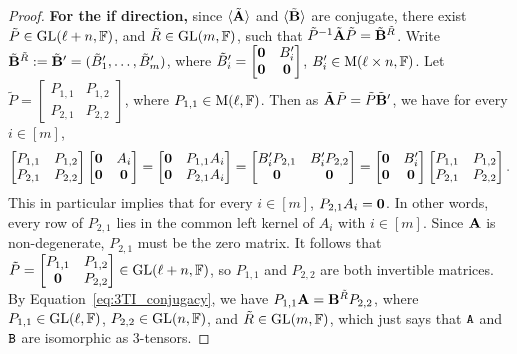 \documentclass[11pt]{article}
\begin{document}
\begin{proof}
\textbf{For the if direction,} since $\langle\tilde{\mathbf{A}}\rangle$ and $\langle\tilde{\mathbf{B}}\rangle$ are conjugate, 
there exist $\tilde P\in\mathrm{GL}(\ell+n, \mathbb{F})$, and $\tilde R\in\mathrm{GL}(m, \mathbb{F})$, such that 
$\tilde P^{-1}\tilde{\mathbf{A}} \tilde P=\tilde{\mathbf{B}}^{\tilde R}$. Write $\tilde{\mathbf{B}}^{\tilde R}:=\tilde{\mathbf{B}}'=(\tilde B_1', 
\dots, \tilde 
B_m')$, where $\tilde B_i'=\begin{bmatrix}
\mathbf{0} & B_i'\\
\mathbf{0} & \mathbf{0} 
\end{bmatrix}$, $B_i'\in\mathrm{M}(\ell\times n, \mathbb{F})$. Let $\tilde P=\begin{bmatrix}
P_{1,1} & P_{1,2}\\
P_{2,1} & P_{2,2}
\end{bmatrix}$, where $P_{1,1}\in \mathrm{M}(\ell, \mathbb{F})$. Then as $\tilde{\mathbf{A}} 
\tilde P=\tilde P\tilde{\mathbf{B}}'$, we have for every $i\in[m]$,
\begin{equation}\label{eq:3TI_conjugacy}
\begin{bmatrix}
P_{1,1} & P_{1,2}\\
P_{2,1} & P_{2,2}
\end{bmatrix}
\begin{bmatrix}
\mathbf{0} & A_i\\
\mathbf{0} & \mathbf{0} 
\end{bmatrix}
=
\begin{bmatrix}
\mathbf{0} & P_{1,1} A_i \\
\mathbf{0} & P_{2,1} A_i
\end{bmatrix}
=
\begin{bmatrix}
B_i'P_{2,1} & B_i'P_{2,2} \\
\mathbf{0} & \mathbf{0} 
\end{bmatrix}
=
\begin{bmatrix}
\mathbf{0} & B_i'\\
\mathbf{0} & \mathbf{0} 
\end{bmatrix}
\begin{bmatrix}
P_{1,1} & P_{1,2}\\
P_{2,1} & P_{2,2}
\end{bmatrix}.
\end{equation} This in particular implies that for every $i\in[m]$, 
$P_{2,1}A_i=\mathbf{0}$. In 
other words, every row of $P_{2,1}$ lies in the common left kernel of $A_i$ with 
$i\in[m]$. Since $\mathbf{A}$ is non-degenerate, $P_{2,1}$ must be the zero matrix. It 
follows that $\tilde P=\begin{bmatrix}
P_{1,1} & P_{1,2} \\
\mathbf{0} & P_{2,2}
\end{bmatrix}\in\mathrm{GL}(\ell+n, \mathbb{F})$, so $P_{1,1}$ and $P_{2,2}$ are both invertible 
matrices. By Equation~\ref{eq:3TI_conjugacy}, we have $P_{1,1}\mathbf{A}=\mathbf{B}^{\tilde R} P_{2,2}$, 
where $P_{1,1}\in\mathrm{GL}(\ell, \mathbb{F})$, $P_{2,2}\in\mathrm{GL}(n, \mathbb{F})$, and $\tilde R\in\mathrm{GL}(m, \mathbb{F})$, 
which just says that $\mathtt{A}$ and $\mathtt{B}$ are isomorphic as 3-tensors.
\end{proof}
\end{document}
